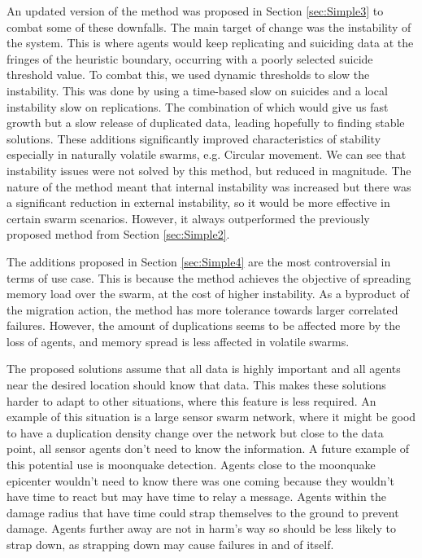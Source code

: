 \documentclass{UoYCSproject}
\begin{document}
An updated version of the method was proposed in Section \ref{sec:Simple3} to combat some of these downfalls.
The main target of change was the instability of the system.
This is where agents would keep replicating and suiciding data at the fringes of the heuristic boundary, occurring with a poorly selected suicide threshold value.
To combat this, we used dynamic thresholds to slow the instability.
This was done by using a time-based slow on suicides and a local instability slow on replications.
The combination of which would give us fast growth but a slow release of duplicated data, leading hopefully to finding stable solutions.
These additions significantly improved characteristics of stability especially in naturally volatile swarms, e.g. Circular movement.
We can see that instability issues were not solved by this method, but reduced in magnitude.
The nature of the method meant that internal instability was increased but there was a significant reduction in external instability, so it would be more effective in certain swarm scenarios.
However, it always outperformed the previously proposed method from Section \ref{sec:Simple2}.

The additions proposed in Section \ref{sec:Simple4} are the most controversial in terms of use case.
This is because the method achieves the objective of spreading memory load over the swarm, at the cost of higher instability.
As a byproduct of the migration action, the method has more tolerance towards larger correlated failures.
However, the amount of duplications seems to be affected more by the loss of agents, and memory spread is less affected in volatile swarms.

The proposed solutions assume that all data is highly important and all agents near the desired location should know that data.
This makes these solutions harder to adapt to other situations, where this feature is less required.
An example of this situation is a large sensor swarm network, where it might be good to have a duplication density change over the network but close to the data point, all sensor agents don't need to know the information.
A future example of this potential use is moonquake detection.
Agents close to the moonquake epicenter wouldn’t need to know there was one coming because they wouldn’t have time to react but may have time to relay a message.
Agents within the damage radius that have time could strap themselves to the ground to prevent damage.
Agents further away are not in harm's way so should be less likely to strap down, as strapping down may cause failures in and of itself.
\end{document}
